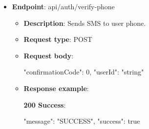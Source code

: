 \begin{itemize}
\begin{itemize}
        \textbf{409 Conflict}:

        \begin{spverbatim}
        {
            "errorMessage": "string",
            "errorDetails": "string",
            "statusCode": 0,
            "success": false
        }
        \end{spverbatim}
        \item \textbf{Response messages}:
        \begin{enumerate}
            \item Success.
            \item User already registered.
            \item Weak password.
            \item Invalid email.
            \item Invalid verification method.
            \item Invalid display name.
            \item Phone occupied.
        \end{enumerate}
        \item \textbf{Response messages}:
        \begin{enumerate}
            \item Success.
            \item Invalid user id.
            \item Email already verified.
        \end{enumerate}
    \end{itemize}

    \item \textbf{Endpoint}: api/auth/verify-phone
    \begin{itemize}
        \item \textbf{Description}: Sends SMS to user phone.
        \item \textbf{Request type}: POST
        \item \textbf{Request body}:
        \begin{spverbatim}
        {
            "confirmationCode": 0,
            "userId": "string"
        }
        \end{spverbatim}
        \item  \textbf{Response example}:

        \textbf{200 Success}:

        \begin{spverbatim}
        {
            "message": "SUCCESS",
            "success": true
        }
        \end{spverbatim}


\end{itemize}
\end{itemize}
